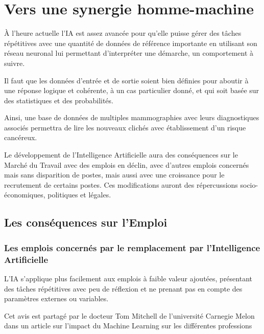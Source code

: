 \part{Vers une synergie homme-machine}
    
À l'heure actuelle l'IA est assez avancée pour qu'elle puisse gérer
des tâches répétitives avec une quantité de données de référence importante
en utilisant son réseau neuronal lui permettant d'interpréter une démarche, un comportement à suivre. \newline

Il faut que les données d'entrée et de sortie soient bien définies pour aboutir
à une réponse logique et cohérente, à un cas particulier donné,
et qui soit basée sur des statistiques et des probabilités. \newline

Ainsi, une base de données de multiples mammographies avec leurs diagnostiques
associés permettra de lire les nouveaux clichés avec établissement d'un risque cancéreux. \newline

Le développement de l'Intelligence Artificielle aura des conséquences sur le Marché du Travail avec des emplois en déclin,
avec d'autres emplois concernés mais sans disparition de postes, mais aussi avec une croissance pour le recrutement de certains postes.
Ces modifications auront des répercussions socio-économiques, politiques et légales. \newline

\chapter{Les conséquences sur l'Emploi}
    \section{Les emplois concernés par le remplacement par l'Intelligence Artificielle}

    L'IA s'applique plus facilement aux emplois à faible valeur ajoutées,
    présentant des tâches répétitives avec peu de réflexion et ne prenant pas en compte des paramètres externes ou variables. \newline

    Cet avis est partagé par le docteur Tom Mitchell de l'université Carnegie Melon dans un article sur l'impact
    du Machine Learning sur les différentes professions \newline

